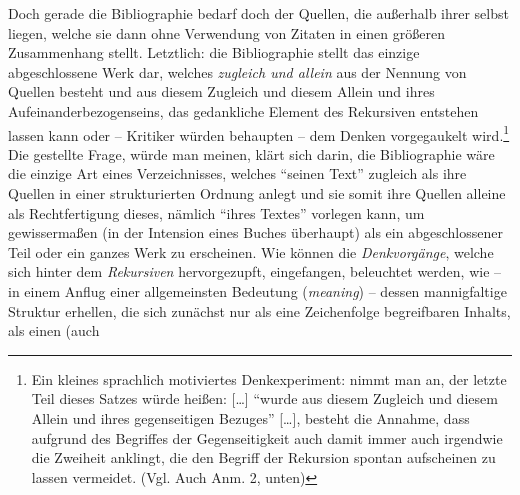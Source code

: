 \documentclass[a4paper,
fontsize=11pt,
oneside,
numbers=noperiodatend,
parskip=half-,
bibliography=totoc,
final
]{scrartcl}
\begin{document}
Doch gerade die Bibliographie bedarf doch der Quellen, die außerhalb
ihrer selbst liegen, welche sie dann ohne Verwendung von Zitaten in
einen größeren Zusammenhang stellt. Letztlich: die Bibliographie stellt
das einzige abgeschlossene Werk dar, welches \emph{zugleich und allein}
aus der Nennung von Quellen besteht und aus diesem Zugleich und diesem
Allein und ihres Aufeinanderbezogenseins, das gedankliche Element des
Rekursiven entstehen lassen kann oder -- Kritiker würden behaupten --
dem Denken vorgegaukelt wird.\footnote{Ein kleines sprachlich
  motiviertes Denkexperiment: nimmt man an, der letzte Teil dieses
  Satzes würde heißen: {[}\ldots{}{]} \enquote{wurde aus diesem Zugleich
  und diesem Allein und ihres gegenseitigen Bezuges} {[}\ldots{}{]},
  besteht die Annahme, dass aufgrund des Begriffes der Gegenseitigkeit
  auch damit immer auch irgendwie die Zweiheit anklingt, die den Begriff
  der Rekursion spontan aufscheinen zu lassen vermeidet. (Vgl. Auch Anm.
  2, unten)} Die gestellte Frage, würde man meinen, klärt sich darin,
die Bibliographie wäre die einzige Art eines Verzeichnisses, welches
\enquote{seinen Text} zugleich als ihre Quellen in einer strukturierten
Ordnung anlegt und sie somit ihre Quellen alleine als Rechtfertigung
dieses, nämlich \enquote{ihres Textes} vorlegen kann, um gewissermaßen
(in der Intension eines Buches überhaupt) als ein abgeschlossener Teil
oder ein ganzes Werk zu erscheinen. Wie können die \emph{Denkvorgänge},
welche sich hinter dem \emph{Rekursiven} hervorgezupft, eingefangen,
beleuchtet werden, wie -- in einem Anflug einer allgemeinsten Bedeutung
(\emph{meaning}) -- dessen mannigfaltige Struktur erhellen, die sich
zunächst nur als eine Zeichenfolge begreifbaren Inhalts, als einen (auch
\end{document}
